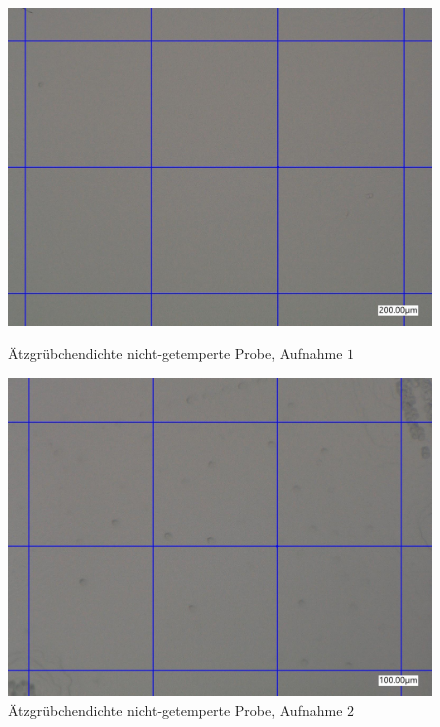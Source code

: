 \documentclass[12pt,a4paper]{scrartcl}
\numberwithin{equation}{section} %
\begin{document}
\begin{figure}[ht]
	\begin{minipage}[t]{.5\linewidth}
		\includegraphics[width=\textwidth]{../media/B2.8/Dichte1_not_tempered.pdf}
		\caption{Ätzgrübchendichte nicht-getemperte Probe, Aufnahme $1$}
		\label{abb:dichte_nt_1}
	\end{minipage}
	\begin{minipage}[t]{.5\linewidth}
		\includegraphics[width=\textwidth]{../media/B2.8/Dichte2_not_tempered.pdf}
		\caption{Ätzgrübchendichte nicht-getemperte Probe, Aufnahme $2$}
		\label{abb:dichte_nt_2}
	\end{minipage}
\end{figure}
\end{document}
